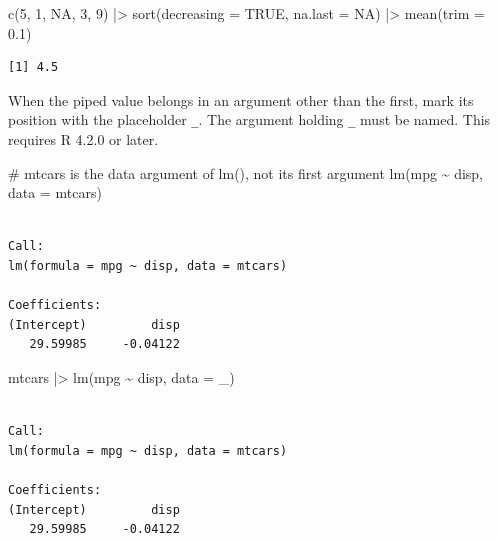 \documentclass[
  letterpaper,
  DIV=11,
  numbers=noendperiod]{scrreprt}
\newenvironment{Shaded}{\begin{snugshade}}{\end{snugshade}}
\newcommand{\AttributeTok}[1]{\textcolor[rgb]{0.40,0.45,0.13}{#1}}
\newcommand{\CommentTok}[1]{\textcolor[rgb]{0.37,0.37,0.37}{#1}}
\newcommand{\ConstantTok}[1]{\textcolor[rgb]{0.56,0.35,0.01}{#1}}
\newcommand{\DecValTok}[1]{\textcolor[rgb]{0.68,0.00,0.00}{#1}}
\newcommand{\FloatTok}[1]{\textcolor[rgb]{0.68,0.00,0.00}{#1}}
\newcommand{\FunctionTok}[1]{\textcolor[rgb]{0.28,0.35,0.67}{#1}}
\newcommand{\NormalTok}[1]{\textcolor[rgb]{0.00,0.23,0.31}{#1}}
\newcommand{\SpecialCharTok}[1]{\textcolor[rgb]{0.37,0.37,0.37}{#1}}
\renewcommand{\[}{\begin{equation}}
\renewcommand{\]}{\end{equation}}
\begin{document}
\begin{Shaded}
\begin{Highlighting}[]
\FunctionTok{c}\NormalTok{(}\DecValTok{5}\NormalTok{, }\DecValTok{1}\NormalTok{, }\ConstantTok{NA}\NormalTok{, }\DecValTok{3}\NormalTok{, }\DecValTok{9}\NormalTok{) }\SpecialCharTok{|\textgreater{}}
  \FunctionTok{sort}\NormalTok{(}\AttributeTok{decreasing =} \ConstantTok{TRUE}\NormalTok{, }\AttributeTok{na.last =} \ConstantTok{NA}\NormalTok{) }\SpecialCharTok{|\textgreater{}}
  \FunctionTok{mean}\NormalTok{(}\AttributeTok{trim =} \FloatTok{0.1}\NormalTok{)}
\end{Highlighting}
\end{Shaded}

\begin{verbatim}
[1] 4.5
\end{verbatim}

When the piped value belongs in an argument other than the first, mark
its position with the placeholder \texttt{\_}. The argument holding
\texttt{\_} must be named. This requires R 4.2.0 or later.

\begin{Shaded}
\begin{Highlighting}[]
\CommentTok{\# mtcars is the \textasciigrave{}data\textasciigrave{} argument of lm(), not its first argument}
\FunctionTok{lm}\NormalTok{(mpg }\SpecialCharTok{\textasciitilde{}}\NormalTok{ disp, }\AttributeTok{data =}\NormalTok{ mtcars)}
\end{Highlighting}
\end{Shaded}

\begin{verbatim}

Call:
lm(formula = mpg ~ disp, data = mtcars)

Coefficients:
(Intercept)         disp  
   29.59985     -0.04122  
\end{verbatim}

\begin{Shaded}
\begin{Highlighting}[]
\NormalTok{mtcars }\SpecialCharTok{|\textgreater{}} \FunctionTok{lm}\NormalTok{(mpg }\SpecialCharTok{\textasciitilde{}}\NormalTok{ disp, }\AttributeTok{data =}\NormalTok{ \_)}
\end{Highlighting}
\end{Shaded}

\begin{verbatim}

Call:
lm(formula = mpg ~ disp, data = mtcars)

Coefficients:
(Intercept)         disp  
   29.59985     -0.04122  
\end{verbatim}
\end{document}
